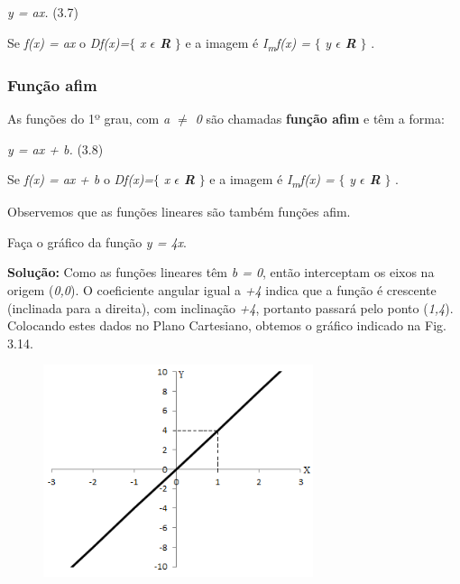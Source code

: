 \begin{FlushRight}
\textit{y = ax.} \tab (3.7)
\end{FlushRight}

Se \textit{f(x) = ax}  o \textit{Df(x)=}$ \{ $ \textit{ x $ \epsilon $  \textbf{R}} $ \} $  e a imagem é    \textit{I\textsubscript{m}f(x) =} $ \{ $ \textit{ y $ \epsilon $  \textbf{R}} $ \} $ .

\subsubsection{Função afim}

As funções do 1º grau, com \textit{a $ \neq $   0}  são chamadas \textbf{função afim} e têm a forma:

\begin{FlushRight}
\textit{y = ax + b.} \tab (3.8)
\end{FlushRight}

Se \textit{f(x) = ax} \textit{+ b} o \textit{Df(x)=}$ \{ $ \textit{ x $ \epsilon $  \textbf{R}} $ \} $  e a imagem é    \textit{I\textsubscript{m}f(x) =} $ \{ $ \textit{ y $ \epsilon $  \textbf{R}} $ \} $ .

Observemos que as funções lineares são também funções afim.

\begin{texemplo}
Faça o gráfico da função  \textit{y = 4x}.

\textbf{Solução:} Como as funções lineares têm  \textit{b = 0}, então interceptam os eixos na origem (\textit{0,0}). O coeficiente angular igual a \textit{+4} indica que a função é crescente (inclinada para a direita), com inclinação \textit{+4}, portanto passará pelo ponto (\textit{1,4}). Colocando estes dados no Plano Cartesiano, obtemos o gráfico indicado na Fig. 3.14.

\begin{figure}[H]
	\begin{Center}
		\includegraphics[width=3.12in,height=2.44in]{capitulos/funcao_do_primeiro_grau/media/image21.png} \qedsymbol{}
	\end{Center}
\end{figure}
\end{texemplo}


